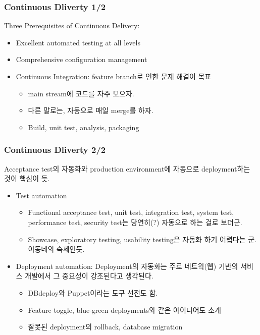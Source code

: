 \begin{frame}
\frametitle{Continuous Dliverty 1/2}
 
Three Prerequisites of Continuous Delivery:
\begin{itemize}
\item Excellent automated testing at all levels
\item Comprehensive configuration management
\item Continuous Integration: feature branch로 인한 문제 해결이 목표
  \begin{itemize}
  \item main stream에 코드를 자주 모으자.
  \item 다른 말로는, 자동으로 매일 merge를 하자.
  \item Build, unit test, analysis, packaging
  \end{itemize}
\end{itemize}
\end{frame}

\begin{frame}
\frametitle{Continuous Dliverty 2/2}

Acceptance test의 자동화와 production environment에 자동으로
deployment하는 것이 핵심이 듯.
 
\begin{itemize}
\item Test automation
  \begin{itemize}
  \item Functional acceptance test, unit test, integration test,
    system test, performance test, security test는 당연히(?) 자동으로
    하는 걸로 보더군.
  \item Showcase, exploratory testing, usability testing은 자동화 하기
    어렵다는 군. 이동네의 숙제인듯.
  \end{itemize}
\item Deployment automation: Deployment의 자동화는 주로 네트웍(웹)
  기반의 서비스 개발에서 그 중요성이 강조된다고 생각된다.
  \begin{itemize}
  \item DBdeploy와 Puppet이라는 도구 선전도 함.
  \item Feature toggle, blue-green deployments와 같은 아이디어도 소개
  \item 잘못된 deployment의 rollback, database migration
  \end{itemize}
\end{itemize}

\end{frame}
